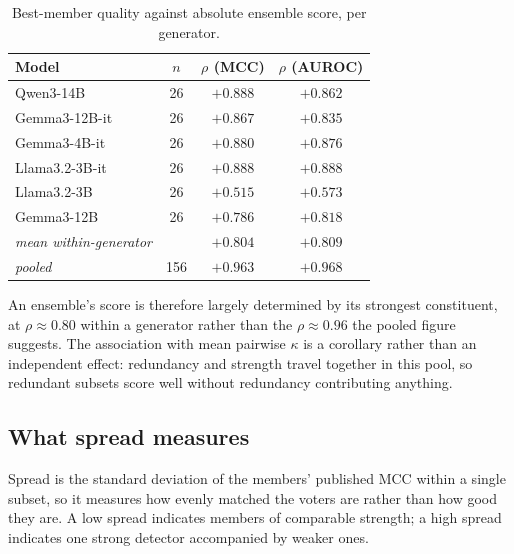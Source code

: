 \begin{table}[h]\centering\footnotesize
  \caption{Best-member quality against absolute ensemble score, per generator.}
  \begin{tabular}{l c c c}
    \hline
    Model & $n$ & $\rho$ (MCC) & $\rho$ (AUROC) \\
    \hline
    Qwen3-14B & 26 & $+0.888$ & $+0.862$ \\
    Gemma3-12B-it & 26 & $+0.867$ & $+0.835$ \\
    Gemma3-4B-it & 26 & $+0.880$ & $+0.876$ \\
    Llama3.2-3B-it & 26 & $+0.888$ & $+0.888$ \\
    Llama3.2-3B & 26 & $+0.515$ & $+0.573$ \\
    Gemma3-12B & 26 & $+0.786$ & $+0.818$ \\
    \hline
    \textit{mean within-generator} & & $\mathbf{+0.804}$ & $\mathbf{+0.809}$ \\
    \textit{pooled} & 156 & $+0.963$ & $+0.968$ \\
    \hline\end{tabular}\end{table}

An ensemble's score is therefore largely determined by its strongest constituent,
at $\rho \approx 0.80$ within a generator rather than the $\rho \approx 0.96$ the
pooled figure suggests. The association with mean pairwise $\kappa$ is a corollary rather
than an independent effect: redundancy and strength travel together in this pool, so
redundant subsets score well without redundancy contributing anything.

\subsection{What spread measures}

Spread is the standard deviation of the members' published MCC within a single
subset, so it measures how evenly matched the voters are rather than how good they are. A
low spread indicates members of comparable strength; a high spread indicates one strong
detector accompanied by weaker ones.

